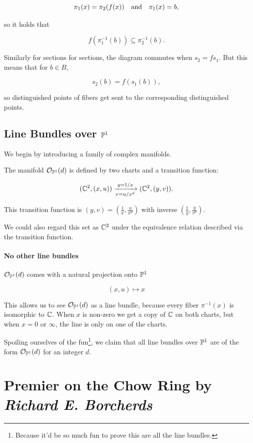 \documentclass[12pt]{memoir}
\begin{document}
\[\pi_1(x)=\pi_2(f(x))\quad\text{and}\quad\pi_1(x)=b,\]

so it holds that

\[f\left(\pi^{-1}_1(b)\right)\subseteq \pi_2^{-1}(b).\]

Similarly for sections for sections, the diagram commutes when \(s_2=fs_1\). But this means that for \(b\in B\),

\[s_2(b)=f(s_1(b)),\]

so distinguished points of fibers get sent to the corresponding distinguished points.

\section{Line Bundles over \(\mathbb{P}^1\)}

We begin by introducing a family of complex manifolds.

\begin{Def}
    The manifold \(\mathcal{O}_{\mathbb{P}^1}(d)\) is defined by two charts and a transition function:

    \[(\mathbb{C}^2,(x,u))\xrightarrow[v=u/x^d]{y=1/x}(\mathbb{C}^2,(y,v)).\]

    This transition function is  \((y,v)=\left(\frac{1}{x},\frac{u}{x^d}\right)\) with inverse \(\left(\frac{1}{y},\frac{y}{v^d}\right)\).
\end{Def}
We could also regard this set as \(\mathbb{C}^2\) under the equivalence relation described via the transition function.

\subsubsection{No other line bundles}
\(\mathcal{O}_{\mathbb{P}^1}(d)\) comes with a natural projection onto \(\mathbb{P}^1\)

\[(x,u)\mapsto x\]

This allows us to see \(\mathcal{O}_{\mathbb{P}^1}(d)\) as a line bundle, because every fiber \(\pi^{-1}(x)\) is isomorphic to \(\mathbb{C}\). When \(x\) is non-zero we get a copy of \(\mathbb{C}\) on both charts, but when \(x=0\) or \(\infty\), the line is only on one of the charts.\par
Spoiling ourselves of the fun\footnote{Because it'd be so much fun to prove this are all the line bundles.}, we claim that all line bundles over \(\mathbb{P}^1\) are of the form \(\mathcal{O}_{\mathbb{P}^1}(d)\) for an integer \(d\).

\chapter{Premier on the Chow Ring by \emph{Richard E. Borcherds}}
\end{document}
